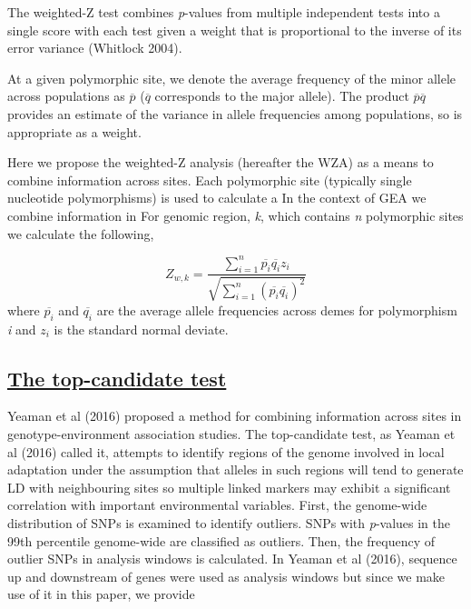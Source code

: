 \documentclass[11pt,twoside,lineno]{GSA_format}
\begin{document}
The weighted-Z test combines \textit{p}-values from multiple independent tests into a single score with each test given a weight that is proportional to the inverse of its error variance (Whitlock 2004). 

At a given polymorphic site, we denote the average frequency of the minor allele across populations as $\overline{p}$ ($\overline{q}$ corresponds to the major allele). The product $\overline{p}\overline{q}$ provides an estimate of the variance in allele frequencies among populations, so is appropriate as a weight.  

Here we propose the weighted-Z analysis (hereafter the WZA) as a means to combine information across sites. Each polymorphic site (typically single nucleotide polymorphisms) is used to calculate a 
In the context of GEA we combine information in 
For genomic region, \textit{k}, which contains \textit{n} polymorphic sites we calculate the following,

\begin{equation}
\label{weightedZ}
Z_{w,k} =  \frac {\sum\limits_{i=1}^n \overline{p_i} \overline{q_i}z_i}{\sqrt{ \sum\limits_{i=1}^n (\overline{p_i}\overline{q_i})^2} }
\end{equation}
where $\overline{p_i}$ and $\overline{q_i}$ are the average allele frequencies across demes for polymorphism \textit{i} and $z_i$ is the standard normal deviate.



\subsection{\underline{The top-candidate test}} 

Yeaman et al (2016) proposed a method for combining information across sites in genotype-environment association studies. The top-candidate test, as Yeaman et al (2016)  called it, attempts to identify regions of the genome involved in local adaptation under the assumption that alleles in such regions will tend to generate LD with neighbouring sites so multiple linked markers may exhibit a significant correlation with important environmental variables. First, the genome-wide distribution of SNPs is examined to identify outliers. SNPs with \textit{p}-values in the 99th percentile genome-wide are classified as outliers. Then, the frequency of outlier SNPs in analysis windows is calculated. In Yeaman et al (2016), sequence up and downstream of genes were used as analysis windows
 but since we make use of it in this paper, we provide 
\end{document}
